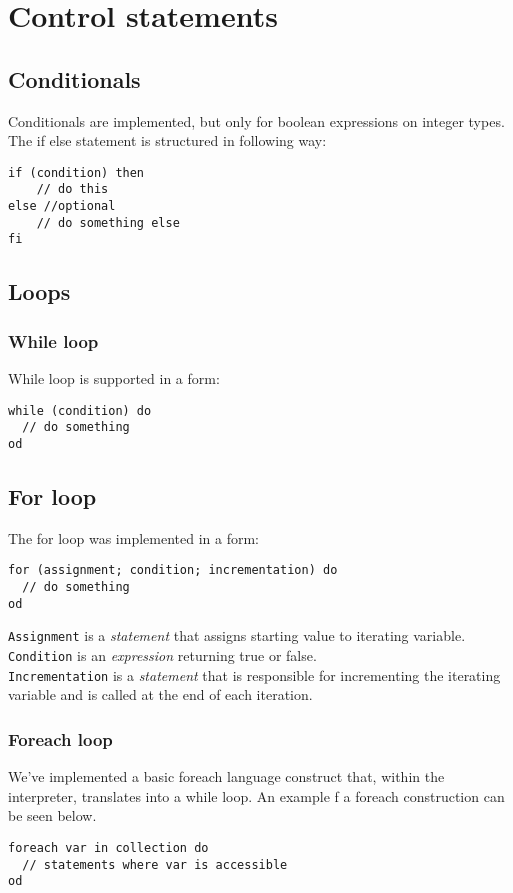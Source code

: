 \documentclass[10pt]{scrartcl}
\begin{document}
\section{Control statements}
\subsection{Conditionals}
Conditionals are implemented, but only for boolean expressions on integer types. The if else statement is structured in following way:
\begin{lstlisting}
if (condition) then
	// do this
else //optional
	// do something else
fi
\end{lstlisting}
\subsection{Loops}
\subsubsection{While loop}
While loop is supported in a form:
\begin{lstlisting}
while (condition) do
  // do something
od
\end{lstlisting}	
\subsection{For loop}
The for loop was implemented in a form:
\begin{lstlisting}
for (assignment; condition; incrementation) do
  // do something
od
\end{lstlisting}	
\texttt{Assignment} is a \emph{statement} that assigns starting value to iterating variable. \\
\texttt{Condition} is an \emph{expression} returning true or false. \\
\texttt{Incrementation} is a \emph{statement} that is responsible for incrementing the iterating variable and is called at the end of each iteration.
\subsubsection{Foreach loop}
We've implemented a basic foreach language construct that, within the interpreter, translates into a while loop. An example f a foreach construction can be seen below.
  \begin{lstlisting}
foreach var in collection do
  // statements where var is accessible
od
\end{lstlisting}
\end{document}
